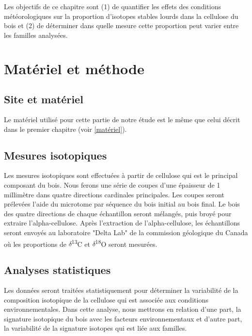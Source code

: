 \documentclass[a4paper,12pt]{report}
\newcommand{\Ctreize}{$\delta$\textsuperscript{13}C\xspace}
\newcommand{\Odixhuit}{$\delta$\textsuperscript{18}O\xspace}
\begin{document}
Les objectifs de ce chapitre sont (1) de quantifier les effets des conditions météorologiques sur la proportion d'isotopes stables lourds dans la cellulose du bois et (2) de déterminer dans quelle mesure cette proportion peut varier entre les familles analysées. %

\section{Matériel et méthode}

\subsection*{Site et matériel}
Le matériel utilisé pour cette partie de notre étude est le même que celui décrit dans le premier chapitre (voir \ref{matériel}).  


\subsection*{Mesures isotopiques}
Les mesures isotopiques sont effectuées à partir de cellulose qui est le principal composant du bois. Nous ferons une série de coupes d'une épaisseur de 1 millimètre dans quatre directions cardinales principales. Les coupes seront prélevées l'aide du microtome par séquence du bois initial au bois final. Le bois des quatre directions de chaque échantillon seront mélangés, puis broyé pour extraire l'alpha-cellulose. Après l'extraction de l'alpha-cellulose, les échantillons seront envoyés au laboratoire "Delta Lab" de la commission géologique du Canada où les proportions de \Ctreize et \Odixhuit seront mesurées.

\subsection*{Analyses statistiques}
Les données seront traitées statistiquement pour déterminer la variabilité de la composition isotopique de la cellulose qui est associée aux conditions environnementales. Dans cette analyse, nous mettrons en relation d'une part, la signature isotopique du bois avec les facteurs environnementaux et d'autre part, la variabilité de la signature isotopes qui est liée aux familles. \\
\end{document}
